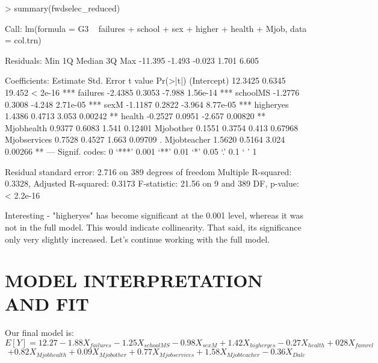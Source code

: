 \documentclass{article}
\begin{document}
\begin{Schunk}
\begin{Sinput}
> summary(fwdselec_reduced)
\end{Sinput}
\begin{Soutput}
Call:
lm(formula = G3 ~ failures + school + sex + higher + health + 
    Mjob, data = col.trn)

Residuals:
    Min      1Q  Median      3Q     Max 
-11.395  -1.493  -0.023   1.701   6.605 

Coefficients:
             Estimate Std. Error t value Pr(>|t|)    
(Intercept)   12.3425     0.6345  19.452  < 2e-16 ***
failures      -2.4385     0.3053  -7.988 1.56e-14 ***
schoolMS      -1.2776     0.3008  -4.248 2.71e-05 ***
sexM          -1.1187     0.2822  -3.964 8.77e-05 ***
higheryes      1.4386     0.4713   3.053  0.00242 ** 
health        -0.2527     0.0951  -2.657  0.00820 ** 
Mjobhealth     0.9377     0.6083   1.541  0.12401    
Mjobother      0.1551     0.3754   0.413  0.67968    
Mjobservices   0.7528     0.4527   1.663  0.09709 .  
Mjobteacher    1.5620     0.5164   3.024  0.00266 ** 
---
Signif. codes:  0 ‘***’ 0.001 ‘**’ 0.01 ‘*’ 0.05 ‘.’ 0.1 ‘ ’ 1

Residual standard error: 2.716 on 389 degrees of freedom
Multiple R-squared:  0.3328,	Adjusted R-squared:  0.3173 
F-statistic: 21.56 on 9 and 389 DF,  p-value: < 2.2e-16
\end{Soutput}
\end{Schunk}

Interesting - "higheryes" has become significant at the 0.001 level, whereas it was not in the full model. This would indicate collinearity. That said, its significance only very slightly increased. Let's continue working with the full model.


\section{MODEL INTERPRETATION AND FIT}


Our final model is:
$$E[Y]=12.27-1.88X_{failures}-1.25X_{schoolMS}-0.98X_{sexM}+1.42X_{higheryes}-0.27X_{health}+028X_{famrel}$$
$$+0.82X_{Mjobhealth}+0.09X_{Mjobother}+0.77X_{Mjobservices}+1.58X_{Mjobteacher}-0.36X_{Dalc} $$
\end{document}
